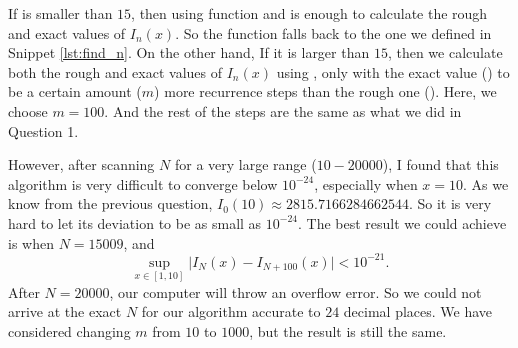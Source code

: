 If  is smaller than \(15\), then using function  and
 is enough to calculate the rough and exact values of \(I_n(x)\). So the
 function falls back to the one we defined in Snippet \ref{lst:find_n}. On the
other hand, If it is larger than \(15\), then we calculate both the rough and exact values of
\(I_n(x)\) using , only with the exact value () to
be a certain amount (\(m\)) more recurrence steps than the rough one (). Here, we
choose \(m = 100\).
And the rest of the steps are the same as what we did in Question 1.

However, after scanning \(N\) for a very large range (\(10 - 20000\)), I found that this
algorithm is very difficult to converge below \(10^{-24}\), especially when \(x = 10\).
As we know from the previous question, \(I_0(10) \approx 2815.7166284662544\). So it is
very hard to let its deviation to be as small as \(10^{-24}\). The best result we
could achieve is when \(N = 15009\), and
%
\begin{equation}
    \sup_{x \in [1, 10]} \lvert I_{N}(x) - I_{N+100}(x) \rvert < 10^{-21}.
\end{equation}
%
After \(N = 20000\), our computer will throw an overflow error. So we could not
arrive at the exact \(N\) for our algorithm accurate to \(24\) decimal places.
We have considered changing \(m\) from \(10\) to \(1000\), but the result is still
the same.

